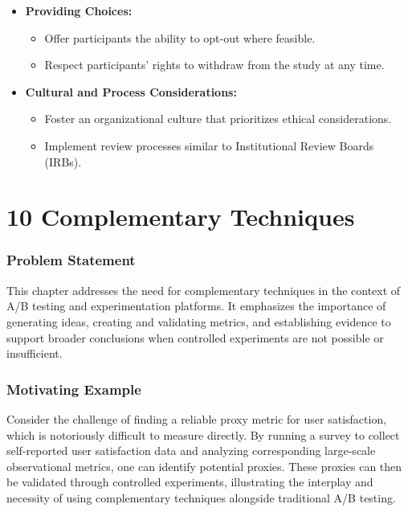 \documentclass{article}
\begin{document}
\begin{itemize}
    \item \textbf{Providing Choices:}
    \begin{itemize}
        \item Offer participants the ability to opt-out where feasible.
        \item Respect participants' rights to withdraw from the study at any time.
    \end{itemize}

    \item \textbf{Cultural and Process Considerations:}
    \begin{itemize}
        \item Foster an organizational culture that prioritizes ethical considerations.
        \item Implement review processes similar to Institutional Review Boards (IRBs).
    \end{itemize}
\end{itemize}

\section*{10 Complementary Techniques}
\subsubsection*{Problem Statement}
This chapter addresses the need for complementary techniques in the context of A/B testing and experimentation platforms. It emphasizes the importance of generating ideas, creating and validating metrics, and establishing evidence to support broader conclusions when controlled experiments are not possible or insufficient.

\subsubsection*{Motivating Example}
Consider the challenge of finding a reliable proxy metric for user satisfaction, which is notoriously difficult to measure directly. By running a survey to collect self-reported user satisfaction data and analyzing corresponding large-scale observational metrics, one can identify potential proxies. These proxies can then be validated through controlled experiments, illustrating the interplay and necessity of using complementary techniques alongside traditional A/B testing.
\end{document}
